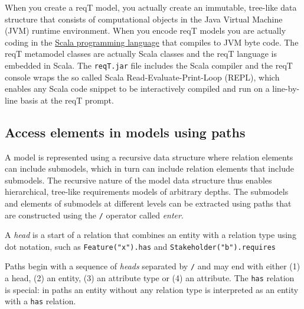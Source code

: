 \documentclass[11pt]{article}
\begin{document}
When you create a reqT model, you actually create an immutable, tree-like data structure that consists of computational objects in the Java Virtual Machine (JVM) runtime environment. When you encode reqT models you are actually coding in the \href{http://en.wikipedia.org/wiki/Scala_\%28programming_language\%29} {Scala programming language} that compiles to JVM byte code. The reqT metamodel classes are actually Scala classes and the reqT language is embedded in Scala. The \verb+reqT.jar+ file includes the Scala compiler and the reqT console wraps the so called Scala Read-Evaluate-Print-Loop (REPL), which enables any Scala code snippet to be interactively compiled and run on a line-by-line basis at the reqT prompt. 
\subsection{Access elements in models using paths}

A model is represented using a recursive data structure where relation elements can include submodels, which in turn can include relation elements that include submodels. The recursive nature of the model data structure thus enables hierarchical, tree-like requirements models of arbitrary depths. The submodels and elements of submodels at different levels can be extracted using paths that are constructed using the \verb+/+ operator called {\it enter}. 

A {\it head} is a start of a relation that combines an entity with a relation type using dot notation, such as  
\verb+Feature("x").has+ and \verb+Stakeholder("b").requires+  

Paths begin with a sequence of {\it heads} separated by \verb+/+ and may end with either (1) a head, (2) an entity, (3) an attribute type or (4) an attribute. The \verb+has+ relation is special: in paths an entity without any relation type is interpreted as an entity with a \verb+has+ relation. 
\end{document}
